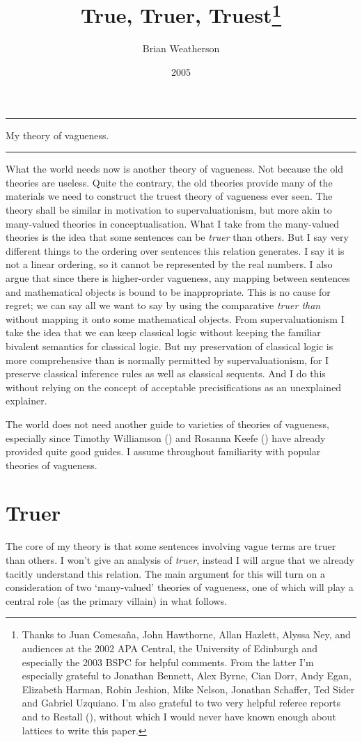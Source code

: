 \documentclass[
  10pt,
  letterpaper,
  DIV=11,
  numbers=noendperiod,
  twoside]{scrartcl}
\title{True, Truer, Truest\thanks{Thanks to Juan Comesaña, John
Hawthorne, Allan Hazlett, Alyssa Ney, and audiences at the 2002 APA
Central, the University of Edinburgh and especially the 2003 BSPC for
helpful comments. From the latter I'm especially grateful to Jonathan
Bennett, Alex Byrne, Cian Dorr, Andy Egan, Elizabeth Harman, Robin
Jeshion, Mike Nelson, Jonathan Schaffer, Ted Sider and Gabriel Uzquiano.
I'm also grateful to two very helpful referee reports and to Restall
(\citeproc{ref-Restall2000}{1999}), without which I would never have
known enough about lattices to write this paper.}}
\author{Brian Weatherson}
\date{2005}
\renewenvironment{abstract}
 {\vspace{-1.25cm}
 \quotation\small\noindent\rule{\linewidth}{.5pt}\par\smallskip
 \noindent }
 {\par\noindent\rule{\linewidth}{.5pt}\endquotation}
\begin{document}
\maketitle
\begin{abstract}
My theory of vagueness.
\end{abstract}


What the world needs now is another theory of vagueness. Not because the
old theories are useless. Quite the contrary, the old theories provide
many of the materials we need to construct the truest theory of
vagueness ever seen. The theory shall be similar in motivation to
supervaluationism, but more akin to many-valued theories in
conceptualisation. What I take from the many-valued theories is the idea
that some sentences can be \emph{truer} than others. But I say very
different things to the ordering over sentences this relation generates.
I say it is not a linear ordering, so it cannot be represented by the
real numbers. I also argue that since there is higher-order vagueness,
any mapping between sentences and mathematical objects is bound to be
inappropriate. This is no cause for regret; we can say all we want to
say by using the comparative \emph{truer than} without mapping it onto
some mathematical objects. From supervaluationism I take the idea that
we can keep classical logic without keeping the familiar bivalent
semantics for classical logic. But my preservation of classical logic is
more comprehensive than is normally permitted by supervaluationism, for
I preserve classical inference rules as well as classical sequents. And
I do this without relying on the concept of acceptable precisifications
as an unexplained explainer.

The world does not need another guide to varieties of theories of
vagueness, especially since Timothy Williamson
() and Rosanna Keefe
() have already provided quite good
guides. I assume throughout familiarity with popular theories of
vagueness.

\section{Truer}\label{truer}

The core of my theory is that some sentences involving vague terms are
truer than others. I won't give an analysis of \emph{truer}, instead I
will argue that we already tacitly understand this relation. The main
argument for this will turn on a consideration of two `many-valued'
theories of vagueness, one of which will play a central role (as the
primary villain) in what follows.
\end{document}
